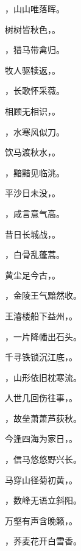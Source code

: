 \documentclass[12pt, a4paper, addpoints]{exam}
\begin{document}
\begin{questions}
\question[1] \uline{\qquad\qquad\qquad}，山山唯落晖。

\question[1] 树树皆秋色，\uline{\qquad\qquad\qquad}。

\question[1] \uline{\qquad\qquad\qquad}，猎马带禽归。

\question[1] 牧人驱犊返，\uline{\qquad\qquad\qquad}。

\question[1] \uline{\qquad\qquad\qquad}，长歌怀采薇。

\question[1] 相顾无相识，\uline{\qquad\qquad\qquad}。

\question[1] \uline{\qquad\qquad\qquad}，水寒风似刀。

\question[1] 饮马渡秋水，\uline{\qquad\qquad\qquad}。

\question[1] \uline{\qquad\qquad\qquad}，黯黯见临洮。

\question[1] 平沙日未没，\uline{\qquad\qquad\qquad}。

\question[1] \uline{\qquad\qquad\qquad}，咸言意气高。

\question[1] 昔日长城战，\uline{\qquad\qquad\qquad}。

\question[1] \uline{\qquad\qquad\qquad}，白骨乱蓬蒿。

\question[1] 黄尘足今古，\uline{\qquad\qquad\qquad}。

\question[1] \uline{\qquad\qquad\qquad}，金陵王气黯然收。

\question[1] 王濬楼船下益州，\uline{\qquad\qquad\qquad}。

\question[1] \uline{\qquad\qquad\qquad}，一片降幡出石头。

\question[1] 千寻铁锁沉江底，\uline{\qquad\qquad\qquad}。

\question[1] \uline{\qquad\qquad\qquad}，山形依旧枕寒流。

\question[1] 人世几回伤往事，\uline{\qquad\qquad\qquad}。

\question[1] \uline{\qquad\qquad\qquad}，故垒萧萧芦荻秋。

\question[1] 今逢四海为家日，\uline{\qquad\qquad\qquad}。

\question[1] \uline{\qquad\qquad\qquad}，信马悠悠野兴长。

\question[1] 马穿山径菊初黄，\uline{\qquad\qquad\qquad}。

\question[1] \uline{\qquad\qquad\qquad}，数峰无语立斜阳。

\question[1] 万壑有声含晚籁，\uline{\qquad\qquad\qquad}。

\question[1] \uline{\qquad\qquad\qquad}，荞麦花开白雪香。


\end{questions}
\end{document}

